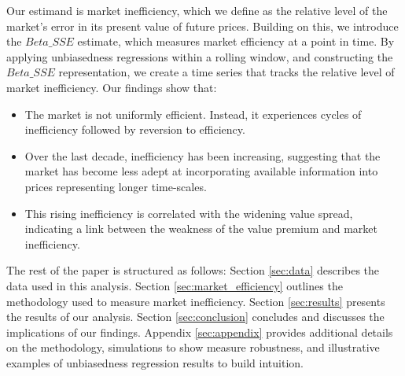 Our estimand is market inefficiency, which we define as the relative level of the market's error in its present value of future prices.
Building on this, we introduce the \textit{$Beta\_SSE$} estimate, which measures market efficiency at a point in time. 
By applying unbiasedness regressions within a rolling window, and constructing the \textit{$Beta\_SSE$} representation, we create a time series that tracks the relative level of market 
inefficiency. \newline
\newline
Our findings show that:
\begin{itemize}
    \item The market is not uniformly efficient. Instead, it experiences cycles of inefficiency followed by reversion to efficiency.
    \item Over the last decade, inefficiency has been increasing, suggesting that the market has become less adept at incorporating available information into prices representing longer time-scales.
    \item This rising inefficiency is correlated with the widening value spread, indicating a link between the weakness of the value premium and market inefficiency.
\end{itemize}

The rest of the paper is structured as follows: Section \ref{sec:data} describes the data used in this analysis. Section \ref{sec:market_efficiency} outlines the methodology used to measure market inefficiency.
Section \ref{sec:results} presents the results of our analysis. Section \ref{sec:conclusion} concludes and discusses the implications of our findings. 
Appendix \ref{sec:appendix} provides additional details on the methodology, simulations to show measure robustness, and illustrative examples of unbiasedness regression results
to build intuition.